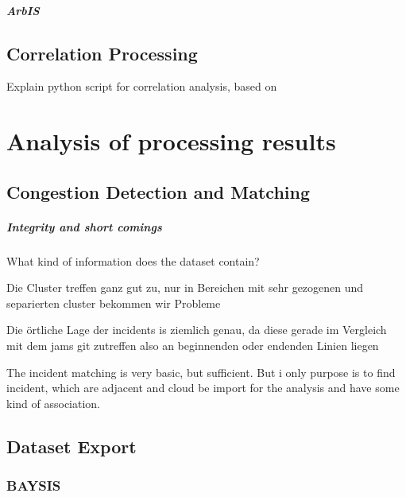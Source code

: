 \documentclass[a4paper,headsepline,footsepline,fontsize=11pt,BCOR=12mm,DIV=12]{report}
\begin{document}
\paragraph{ArbIS}

 
\section{Correlation Processing}
\label{definition_correlation_processing}

Explain python script for correlation analysis, based on \cite{Potvin2020}









\chapter{Analysis of processing results}

\section{Congestion Detection and Matching}

\paragraph{Integrity and short comings}

What kind of information does the dataset contain?

Die Cluster treffen ganz gut zu, nur in Bereichen mit sehr gezogenen und separierten cluster bekommen wir Probleme

Die örtliche Lage der incidents is ziemlich genau, da diese gerade im Vergleich mit dem jams git zutreffen also an beginnenden oder endenden Linien liegen

The incident matching is very basic, but sufficient. But i only purpose is to find incident, which are adjacent and cloud be import for the analysis and have some kind of association.

\section{Dataset Export}

\subsection{BAYSIS}
\end{document}
